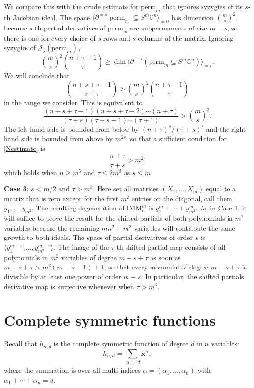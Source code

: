 \documentclass[11pt]{article}
\numberwithin{equation}{section}
\theoremstyle{definition}
\theoremstyle{plain}
\newcommand{\vvirg}{ , \dots , }
\newcommand{\bfx}{\mathbf{x}}
\newcommand{\calJ}{\mathcal{J}}
\newcommand{\perm}{\mathrm{perm}}
\def\BC{\mathbb C}
\def\t{\tau}
\def\tperm{\operatorname{perm}}
\newcommand{\IMM}{\mathrm{IMM}}
\begin{document}
We compare this with the crude estimate for $\perm_m$ that ignores syzygies of its $s$-th Jacobian ideal. The space $\langle \partial^{=s} \tperm_m\subseteq S^m\BC^n \rangle_{=0}$ has dimension $\binom{m}{s}^2$, because $s$-th partial derivatives of $\perm_m$ are subpermanents of size $m-s$, so there is one for every choice of $s$ rows and $s$ columns of the matrix. Ignoring syzygies of $\calJ_s(\perm_m)$\,,
$$
{\binom m s}^2\binom{n+\t-1}{\t} \geq \dim  \langle \partial^{=s}(\perm_m\subseteq S^m\BC^n) \rangle_{=\t}.
$$
We will conclude that
\[
  \binom {n+s+\t-1}{s+\t}>{\binom m s}^2\binom{n+\t-1}{\t}
\]
in the range we consider. This is equivalent to
\begin{equation}\label{Nestimate}
\frac{(n+s+\t-1)( n+s+\t-2)\cdots (n+\t)}{(\t+s)(\t+s-1)\cdots (\t+1)}>{\binom ms}^2.
\end{equation}
The left hand side is bounded from below by ${(n+\tau)^s}/{(\tau + s)^s}$ and the right hand side is bounded from above by $m^{2s}$, so that a sufficient condition for \eqref{Nestimate} is 
 \[
  \frac{n+\tau}{\tau+s} > m^2.
 \]
which holds when $n \geq m^5$  and $\tau \leq 2m^3$ as $s \leq m$. 

 
{\bf Case 3}: $s < {m}/{2}$ and $\t>m^3$. Here set all matrices $(X_1 \vvirg X_m)$ equal to a matrix that is  zero except for  the first $m^2$ entries on the diagonal, call them $y_1 \vvirg y_{m^2}$. The resulting degeneration of $\IMM^m_n$  is $y_1^m+\cdots + y_{m^2}^m$. As in Case 1, it will suffice to prove the result for  the shifted partials of both polynomials in $m^2$ variables because the remaining $mn^2-m^2$ variables will contribute the same growth to both  ideals. The space of partial derivatives of order $s$ is $\langle y_1^{m-s} \vvirg y_{m^2}^{m-s}\rangle$. The image of the $\tau$-th shifted partial map consists of all polynomials in $m^2$ variables of degree $m-s+\t$ as soon as $m-s+\t> m^2(m-s-1)+1$, so that every monomial of degree $m-s+\tau$ is divisible by at least one power of order $m-s$. In particular, the shifted partials derivative map is surjective whenever when $\t>m^3$.  


\section{Complete symmetric functions}

 Recall that  $h_{n,d}$ is the complete symmetric function of degree $d$ in $n$ variables:
\[
 h_{n,d} = \sum_{\vert \alpha \vert = d} \bfx^\alpha,
\]
 where the summation is over all multi-indices $\alpha = (\alpha_1 \vvirg \alpha_n)$ with $\alpha_1 + \cdots + \alpha_n = d$.
\end{document}
